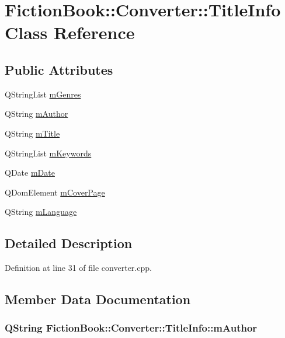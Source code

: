 \hypertarget{classConverter_1_1TitleInfo}{\section{Fiction\+Book\+:\+:Converter\+:\+:Title\+Info Class Reference}
\label{classConverter_1_1TitleInfo}
}
\subsection*{Public Attributes}
\begin{DoxyCompactItemize}
\item 
Q\+String\+List \hyperlink{classConverter_1_1TitleInfo_a733c254bad101a10b5f5179eb0f425ce}{m\+Genres}
\item 
Q\+String \hyperlink{classConverter_1_1TitleInfo_a7ecc1a061f21392a7a3c3daa8792476c}{m\+Author}
\item 
Q\+String \hyperlink{classConverter_1_1TitleInfo_a19645faf3d93e1588645fa6d50daa69a}{m\+Title}
\item 
Q\+String\+List \hyperlink{classConverter_1_1TitleInfo_af5d2aba6b595660501f8aaeab00010f9}{m\+Keywords}
\item 
Q\+Date \hyperlink{classConverter_1_1TitleInfo_a61b420b8e1b57f9ca2c67a0dd99b97a9}{m\+Date}
\item 
Q\+Dom\+Element \hyperlink{classConverter_1_1TitleInfo_afd5944a2140785dd5e82dd104347ea43}{m\+Cover\+Page}
\item 
Q\+String \hyperlink{classConverter_1_1TitleInfo_a92f85102e5c0766f86f1963a3bb35c84}{m\+Language}
\end{DoxyCompactItemize}


\subsection{Detailed Description}


Definition at line 31 of file converter.\+cpp.



\subsection{Member Data Documentation}
\hypertarget{classConverter_1_1TitleInfo_a7ecc1a061f21392a7a3c3daa8792476c}{
\subsubsection[{m\+Author}]{\setlength{\rightskip}{0pt plus 5cm}Q\+String Fiction\+Book\+::\+Converter\+::\+Title\+Info\+::m\+Author}}\label{classConverter_1_1TitleInfo_a7ecc1a061f21392a7a3c3daa8792476c}


